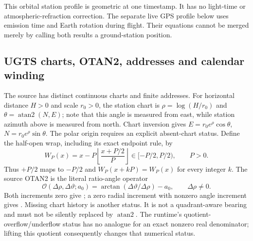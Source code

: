 This orbital station profile is geometric at one timestamp. It has no
light-time or atmospheric-refraction correction. The separate live GPS profile
below uses emission time and Earth rotation during flight. Their equations
cannot be merged merely by calling both results a ground-station position.

\subsection{UGTS charts, OTAN2, addresses and calendar winding}
\label{sec:lift-ugts}
The source  has distinct continuous charts and finite addresses.
For horizontal distance $H>0$ and scale $r_0>0$, the station chart is
$\rho=\log(H/r_0)$ and $\theta=\operatorname{atan2}(N,E)$; note that this angle
is measured from east, while station azimuth above is measured from north.
Chart inversion gives $E=r_0e^\rho\cos\theta$, $N=r_0e^\rho\sin\theta$.
The polar origin requires an explicit absent-chart status.
Define the half-open wrap, including its exact endpoint rule, by
\begin{equation}
 W_P(x)=x-P\left\lfloor\frac{x+P/2}{P}\right\rfloor\in[-P/2,P/2),
 \qquad P>0 .
\end{equation}
Thus $+P/2$ maps to $-P/2$ and $W_P(x+kP)=W_P(x)$ for every integer $k$.
The source OTAN2 is the literal ratio-angle operator
\begin{equation}
 \mathcal O(\Delta\rho,\Delta\vartheta;a_0)
   =\arctan(\Delta\vartheta/\Delta\rho)-a_0,
 \qquad \Delta\rho\ne0 .
\end{equation}
Both increments zero give ; a zero radial increment with
nonzero angle increment gives . Missing chart history
is another status. It is not a quadrant-aware bearing and must not be silently
replaced by $\operatorname{atan2}$. The runtime's quotient-overflow/underflow
 status has no analogue for an exact nonzero real
denominator; lifting this quotient consequently changes that numerical status.

